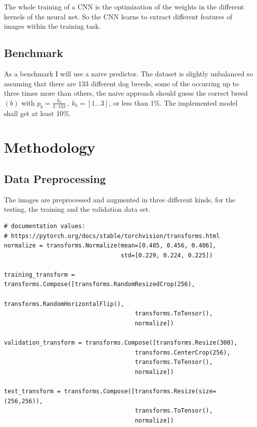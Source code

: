 \documentclass[paper=A4, DIV=10, parskip=half]{scrartcl}
\begin{document}
The whole training of a CNN is the optimization of the weights in the
different kernels of the neural net. So the CNN learns to extract different
features of images within the training task.


\subsection*{Benchmark}

As a benchmark I will use a naive predictor. The dataset is slightly unbalanced so
assuming that there are 133 different dog breeds, some of the occurring up to three times
more than others, the naive approach should guess the correct breed $(b)$ with
$p_{b}=\frac{k_{b}}{3\cdot133}\,,\:k_{b}=\left[1\ldots3\right]$, or less than 1\%. The
implemented model shall get at least 10\%.


\section*{Methodology}

\subsection*{Data Preprocessing}

The images are preprocessed and augmented in three different kinds, for the
testing, the training and the validation data set.

\begin{lstlisting}[caption=Image Transformation, label=image_transformation]
# documentation values:
# https://pytorch.org/docs/stable/torchvision/transforms.html
normalize = transforms.Normalize(mean=[0.485, 0.456, 0.406],  
                                 std=[0.229, 0.224, 0.225])   

training_transform = transforms.Compose([transforms.RandomResizedCrop(256),
                                     transforms.RandomHorizontalFlip(),
                                     transforms.ToTensor(),
                                     normalize])

validation_transform = transforms.Compose([transforms.Resize(300),
                                     transforms.CenterCrop(256),
                                     transforms.ToTensor(),
                                     normalize])

test_transform = transforms.Compose([transforms.Resize(size=(256,256)),
                                     transforms.ToTensor(),
                                     normalize])
\end{lstlisting}
\end{document}
